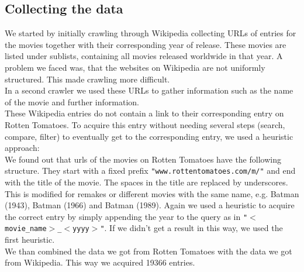\documentclass{article}
\begin{document}
\subsection{Collecting the data}
    We started by initially crawling through Wikipedia collecting URLs of entries for the movies together with their corresponding year of release. These movies are listed under sublists, containing all movies released worldwide in that year. A problem we faced was, that the websites on Wikipedia are not uniformly structured. This made crawling more difficult.\\
    In a second crawler we used these URLs to gather information such as the name of the movie and further information. \\
    These Wikipedia entries do not contain a link to their corresponding entry on Rotten Tomatoes. To acquire this entry without needing several steps (search, compare, filter) to eventually get to the corresponding entry, we used a heuristic approach:\\
    We found out that urls of the movies on Rotten Tomatoes have the following structure. They start with a fixed prefix \texttt{"www.rottentomatoes.com/m/"} and end with the title of the movie. The spaces in the title are replaced by underscores.\\
    This is modified for remakes or different movies with the same name, e.g. Batman (1943), Batman (1966) and Batman (1989)\cite{batman_remakes}.
    Again we used a heuristic to acquire the correct entry by simply appending the year to the query as in \texttt{"$<$movie\_name$>$\_$<$yyyy$>$"}. If we didn't get a result in this way, we used the first heuristic.\\
    We than combined the data we got from Rotten Tomatoes with the data we got from Wikipedia. This way we acquired 19366 entries. %
\end{document}

